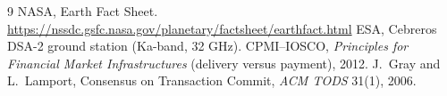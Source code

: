 \documentclass[10pt,letterpaper]{article}
\newcommand{\tablefont}{\normalsize}
\begin{document}
\begingroup\tablefont
\begin{thebibliography}{9}\setlength{\itemsep}{0pt}
 NASA, Earth Fact Sheet. \url{https://nssdc.gsfc.nasa.gov/planetary/factsheet/earthfact.html}
 ESA, Cebreros DSA-2 ground station (Ka-band, 32 GHz).
 CPMI--IOSCO, \emph{Principles for Financial Market Infrastructures} (delivery versus payment), 2012.
 J.~Gray and L.~Lamport, Consensus on Transaction Commit, \emph{ACM TODS} 31(1), 2006.
\end{thebibliography}
\endgroup
\end{document}
